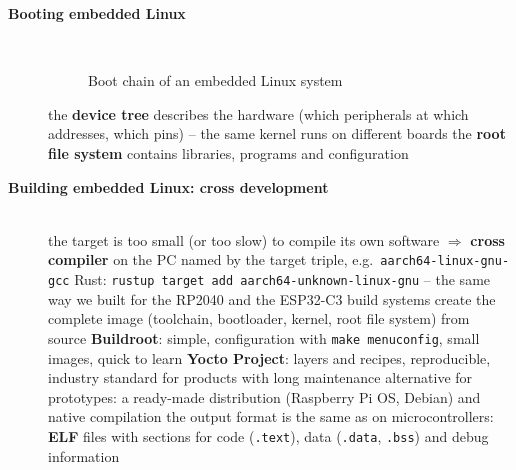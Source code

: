 \begin{description}
\item[{\rot\bf Booting embedded Linux}]~\\[-\lblskip]
\begin{figure}[!hbtp]
\begin{center}
\caption{Boot chain of an embedded Linux system}
\end{center}
\end{figure}
\bi
	\ite the \textbf{device tree} describes the hardware (which peripherals at which addresses, which pins) -- the same kernel runs on different boards
	\ite the \textbf{root file system} contains libraries, programs and configuration
\ei
\os{\newpage}

\item[{\rot\bf Building embedded Linux: cross development}]~\\[-\lblskip]
\bi
	\ite the target is too small (or too slow) to compile its own software $\Rightarrow$ \textbf{cross compiler} on the PC
	\bi
		\ite named by the target triple, e.g.\ \texttt{aarch64-linux-gnu-gcc}
		\ite Rust: \texttt{rustup target add aarch64-unknown-linux-gnu} -- the same way we built for the RP2040 and the ESP32-C3
	\ei
	\ite build systems create the complete image (toolchain, bootloader, kernel, root file system) from source
	\bi
		\ite \textbf{Buildroot}: simple, configuration with \texttt{make menuconfig}, small images, quick to learn
		\ite \textbf{Yocto Project}: layers and recipes, reproducible, industry standard for products with long maintenance
	\ei
	\ite alternative for prototypes: a ready-made distribution (Raspberry Pi OS, Debian) and native compilation
	\ite the output format is the same as on microcontrollers: \textbf{ELF} files with sections for code (\texttt{.text}), data (\texttt{.data}, \texttt{.bss}) and debug information
\ei
\os{\newpage}


\end{description}
